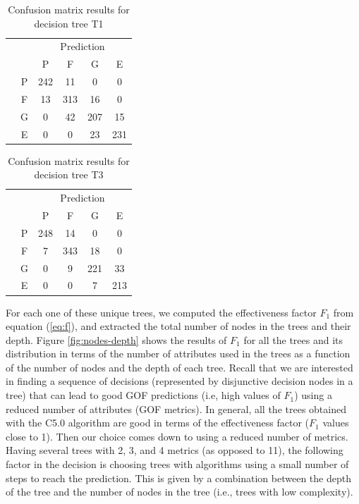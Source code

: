 \begin{table}[t]
	\centering
	\caption{Confusion matrix results for decision tree T1}
	\label{tab:t1:confusion}
	\small
	\begin{tabular}{cccccc}
		& 		& \multicolumn{4}{c}{Prediction}\\ 
		\cline{3-6}
		&   	& P  	& F     & G  	& E 	\\
		\cline{2-6}
		\parbox[t]{2mm}{}  
		& P 	& 242 	& 11 	& 0     & 0    	\\
		& F 	& 13 	& 313   & 16    & 0    	\\
		& G 	& 0 	& 42    & 207   & 15   	\\
		& E 	& 0 	& 0     & 23    & 231	\\ 
	\end{tabular}
\end{table}

\begin{table}[t]
	\centering
	\caption{Confusion matrix results for decision tree T3}
	\label{tab:t3:confusion}
	\small
	\begin{tabular}{cccccc}
		& 		& \multicolumn{4}{c}{Prediction}\\ 
		\cline{3-6}
		&   	& P  	& F     & G  	& E 	\\
		\cline{2-6}
		\parbox[t]{2mm}{\multirow{4}{*}{\rotatebox[origin=c]{90}{Actual}}}  
		& P 	& 248 	& 14 	& 0     & 0    	\\
		& F 	& 7 	& 343   & 18    & 0    	\\
		& G 	& 0 	& 9 	& 221   & 33   	\\
		& E 	& 0 	& 0     & 7    	& 213	\\ 
	\end{tabular}
\end{table}

For each one of these unique trees, we computed the effectiveness factor $F_1$ from equation (\ref{eq:f}), and extracted the total number of nodes in the trees and their depth. Figure \ref{fig:nodes-depth} shows the results of $F_1$ for all the trees and its distribution in terms of the number of attributes used in the trees as a function of the number of nodes and the depth of each tree. Recall that we are interested in finding a sequence of decisions (represented by disjunctive decision nodes in a tree) that can lead to good GOF predictions (i.e, high values of $F_1$) using a reduced number of attributes (GOF metrics). In general, all the trees obtained with the C5.0 algorithm are good in terms of the effectiveness factor ($F_1$ values close to 1). Then our choice comes down to using a reduced number of metrics. Having several trees with 2, 3, and 4 metrics (as opposed to 11), the following factor in the decision is choosing trees with algorithms using a small number of steps to reach the prediction. This is given by a combination between the depth of the tree and the number of nodes in the tree (i.e., trees with low complexity).

